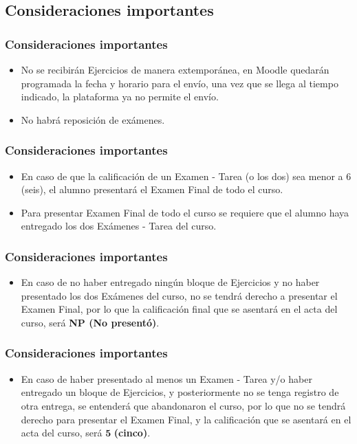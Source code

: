 \documentclass[12pt]{beamer}
\begin{document}
\subsection{Consideraciones importantes}

\begin{frame}
\frametitle{Consideraciones importantes}
\begin{itemize}
\setlength{\itemsep}{0mm}
\item No se recibirán Ejercicios de manera extemporánea, en Moodle quedarán programada la fecha y horario para el envío, una vez que se llega al tiempo indicado, la plataforma ya no permite el envío.
\item No habrá reposición de exámenes.
\end{itemize}
\end{frame}
\begin{frame}
\frametitle{Consideraciones importantes}
\begin{itemize}
\setlength{\itemsep}{0mm}
\item En caso de que la calificación de un Examen - Tarea (o los dos) sea menor a $6$ (seis), el alumno presentará el Examen Final de todo el curso.
\item Para presentar Examen Final de todo el curso se requiere que el alumno haya entregado los dos Exámenes -  Tarea del curso.
\end{itemize}
\end{frame}
\begin{frame}
\frametitle{Consideraciones importantes}
\begin{itemize}
\setlength{\itemsep}{0mm}
\item En caso de no haber entregado ningún bloque de Ejercicios y no haber presentado los dos Exámenes del curso, no se tendrá derecho a presentar el Examen Final, por lo que la calificación final que se asentará en el acta del curso, será \textbf{NP (No presentó)}.
\end{itemize}
\end{frame}
\begin{frame}
\frametitle{Consideraciones importantes}
\begin{itemize}
\setlength{\itemsep}{0mm}
\item En caso de haber presentado al menos un Examen - Tarea y/o haber entregado un bloque de Ejercicios, y posteriormente no se tenga registro de otra entrega, se entenderá que abandonaron el curso, por lo que no se tendrá derecho para presentar el Examen Final, y la calificación que se asentará en el acta del curso, será $\mathbf{5}$ \textbf{(cinco)}.
\end{itemize}
\end{frame}
\end{document}
